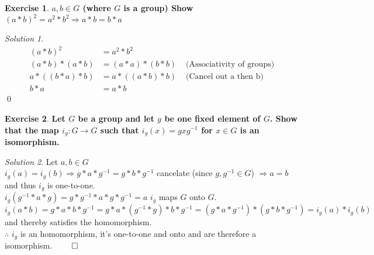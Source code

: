 \documentclass[a4paper,twoside=false,abstract=false,numbers=noenddot,
titlepage=false,headings=small,parskip=half,version=last]{scrartcl}
\theoremstyle{definition}
\newtheorem{exercise}{Exercise}
\theoremstyle{remark}
\newtheorem*{solution}{Solution}
\begin{document}
\begin{exercise}
{\bf
$a,b \in G$ (where $G$ is a group)
Show $(a*b)^2=a^2*b^2 \Rightarrow a*b=b*a$
}
\end{exercise}
\begin{solution}
\begin{align*}
    (a*b)^2 &= a^2*b^2 & \\
    (a*b)*(a*b) &= (a*a)*(b*b) &\mbox{ (Associativity of groups)} \\
    a*((b*a)*b) &= a*((a*b)*b) &\mbox{ (Cancel out a then b)} \\
    b*a &= a*b &
\end{align*}
\qed
\end{solution}


\begin{exercise}
{\bf
Let $G$ be a group and let $g$ be one fixed element of $G$.
Show that the map $i_g : G \rightarrow G$ such that $i_g(x)=gxg^{-1}$ 
for $x \in G$ is an isomorphism. 
}
\end{exercise}
\begin{solution}
Let $a,b \in G$ \\
$i_g(a)=i_g(b) \Rightarrow g*a*g^{-1} = g*b*g^{-1}$ cancelate (since $g,g^{-1} \in G$) $\Rightarrow a=b$ and thus $i_g$ is one-to-one. \\
$i_g(g^{-1}*a*g) = g*g^{-1}*a*g*g^{-1} = a$ $i_g$ maps $G$ onto $G$.\\
$i_g(a*b)=g*a*b*g^{-1}=g*a*(g^{-1}*g)*b*g^{-1}=(g*a*g^{-1})*(g*b*g^{-1})=i_g(a)*i_g(b)$ and thereby satisfies the homomorphism.\\
$\therefore$ $i_g$ is an homomorphism, it's one-to-one and onto and are therefore a isomorphism. $\qed$ 

\end{solution}

\end{document}
